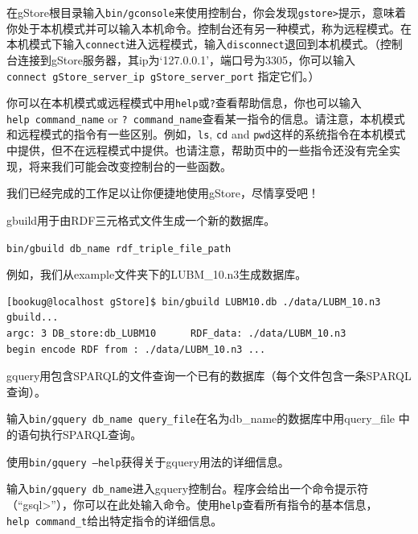 \documentclass[titlepage, a4paper, 12pt]{article}
\begin{document}
在gStore根目录输入\texttt{bin/gconsole}来使用控制台，你会发现\texttt{gstore\textgreater{}}提示，意味着你处于本机模式并可以输入本机命令。控制台还有另一种模式，称为远程模式。在本机模式下输入\texttt{connect}进入远程模式，输入\texttt{disconnect}退回到本机模式。（控制台连接到gStore服务器，其ip为`127.0.0.1'，端口号为3305，你可以输入\texttt{connect\ gStore\_server\_ip\ gStore\_server\_port} 指定它们。）

你可以在本机模式或远程模式中用\texttt{help}或\texttt{?}查看帮助信息，你也可以输入\texttt{help\ command\_name} or \texttt{?\ command\_name}查看某一指令的信息。请注意，本机模式和远程模式的指令有一些区别。例如，\texttt{ls}, \texttt{cd} and \texttt{pwd}这样的系统指令在本机模式中提供，但不在远程模式中提供。也请注意，帮助页中的一些指令还没有完全实现，将来我们可能会改变控制台的一些函数。

我们已经完成的工作足以让你便捷地使用gStore，尽情享受吧！


gbuild用于由RDF三元格式文件生成一个新的数据库。

\texttt{bin/gbuild\ db\_name\ rdf\_triple\_file\_path}

例如，我们从example文件夹下的LUBM\_10.n3生成数据库。

\begin{verbatim}
[bookug@localhost gStore]$ bin/gbuild LUBM10.db ./data/LUBM_10.n3
gbuild...
argc: 3 DB_store:db_LUBM10      RDF_data: ./data/LUBM_10.n3
begin encode RDF from : ./data/LUBM_10.n3 ...
\end{verbatim}


gquery用包含SPARQL的文件查询一个已有的数据库（每个文件包含一条SPARQL查询）。

输入\texttt{bin/gquery\ db\_name\ query\_file}在名为db\_name的数据库中用query\_file 中的语句执行SPARQL查询。

使用\texttt{bin/gquery\ --help}获得关于gquery用法的详细信息。

输入\texttt{bin/gquery\ db\_name}进入gquery控制台。程序会给出一个命令提示符（“gsql\textgreater{}”），你可以在此处输入命令。使用\texttt{help}查看所有指令的基本信息，\texttt{help\ command\_t}给出特定指令的详细信息。
\end{document}
